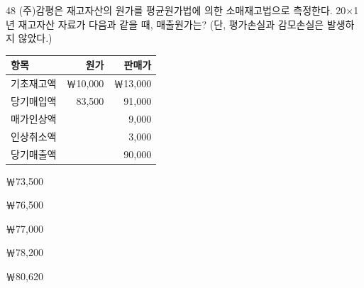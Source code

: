 \begin{question}{48}
(주)감평은 재고자산의 원가를 평균원가법에 의한 소매재고법으로 측정한다. 20×1년 재고자산 자료가 다음과 같을 때, 매출원가는? (단, 평가손실과 감모손실은 발생하지 않았다.)
\par{\small\centering\begin{tabular}{|l|r|r|}\hline
항목 & 원가 & 판매가 \\ \hline
기초재고액 & ￦10,000 & ￦13,000 \\
당기매입액 & 83,500 & 91,000 \\
매가인상액 & & 9,000 \\
인상취소액 & & 3,000 \\
당기매출액 & & 90,000 \\ \hline
\end{tabular}\par}
\begin{choices}
  \item ￦73,500
  \item ￦76,500
  \item ￦77,000
  \item ￦78,200
  \item ￦80,620
\end{choices}
\end{question}
